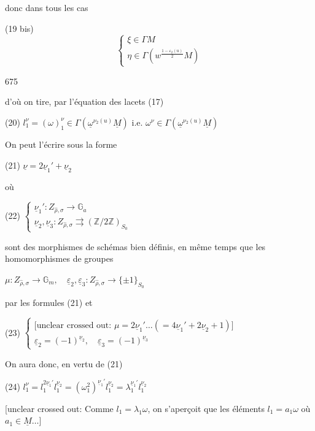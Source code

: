 donc dans tous les cas

(19 bis) $$ \begin{cases} 
\xi \in \Gamma M \\ 
\eta \in \Gamma(w^{\frac{1-\varepsilon_2(u)}{2}} M) 
\end{cases} $$

\newpage


675

d'où on tire, par l'équation des lacets (17)

(20) $l_1^\nu = (\omega)_{1}^\nu \in \Gamma(\underline{\omega}^{\nu_2(u)} \underline{M})$ i.e. $\omega^\nu \in \Gamma(\underline{\omega}^{\nu_2(u)} \underline{M})$

On peut l'écrire sous la forme

(21) $\underline{\nu} = 2 \underline{\nu}_1' + \underline{\nu}_2$

où

(22) $\begin{cases} \underline{\nu}_1' : Z_{\hat{\rho}, \sigma} \to \mathbb{G}_a \\ \underline{\nu}_2, \underline{\nu}_3 : Z_{\hat{\rho}, \sigma} \rightrightarrows (\mathbb{Z}/2\mathbb{Z})_{S_0} \end{cases}$

sont des morphismes de schémas bien définis, en même temps que les homomorphismes de groupes

$\mu : Z_{\hat{\rho}, \sigma} \to \mathbb{G}_m, \quad \underline{\varepsilon}_2, \underline{\varepsilon}_3 : Z_{\hat{\rho}, \sigma} \to \{\pm 1\}_{S_0}$

par les formules (21) et

(23) $\begin{cases} \text{[unclear crossed out: } \mu = 2 \underline{\nu}_1' \dots (= 4 \underline{\nu}_1' + 2 \underline{\nu}_2 + 1) \text{]} \\ \underline{\varepsilon}_2 = (-1)^{\underline{\nu}_2}, \quad \underline{\varepsilon}_3 = (-1)^{\underline{\nu}_3} \end{cases}$

On aura donc, en vertu de (21)

(24) $l_1^\nu = l_1^{2\underline{\nu}_1'} l_1^{\underline{\nu}_2} = (\omega_1^2)^{\underline{\nu}_1'} l_1^{\underline{\nu}_2} = \lambda_1^{\underline{\nu}_1'} l_1^{\underline{\nu}_2}$

[unclear crossed out: Comme $l_1 = \lambda_1 \omega$, on s'aperçoit que les éléments $l_1 = a_1 \omega$ où $a_1 \in \underline{M} \dots$]

